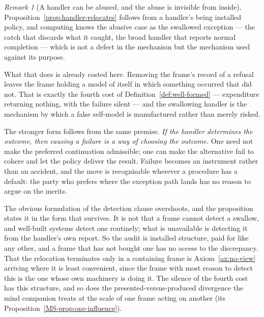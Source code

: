 \documentclass[11pt,a4paper]{article}
\theoremstyle{remark}\newtheorem{remark}[definition]{Remark}
\begin{document}
\begin{remark}[A handler can be abused, and the abuse is invisible from inside]\label{rem:handler-abuse}
Proposition~\ref{prop:handler-relocates} follows from a handler's being installed policy, and
computing knows the abusive case as the swallowed exception --- the catch that discards what it
caught, the broad handler that reports normal completion --- which is not a defect in the mechanism
but the mechanism used against its purpose.

What that does is already costed here. Removing the frame's record of a refusal
leaves the frame holding a model of itself in which
something occurred that did not. That is exactly the fourth cost of Definition~\ref{def:well-formed} ---
expenditure returning nothing, with the failure silent --- and the swallowing handler is the mechanism
by which a false self-model is manufactured rather than merely risked.

The stronger form follows from the same premise. \emph{If the handler
determines the outcome, then causing a failure is a way of choosing the outcome.} One need not make the
preferred continuation admissible; one can make the alternative fail to cohere and let the policy
deliver the result. Failure becomes an instrument rather than an accident, and the move is recognisable
wherever a procedure has a default: the party who prefers where the exception path lands has no reason
to argue on the merits.

The obvious formulation of the detection clause overshoots, and the proposition states it in the
form that survives. It is not that a frame cannot detect a swallow, and well-built systems detect one
routinely; what is unavailable is detecting it from the handler's own report. So the audit is
installed structure, paid for like any other, and a frame that has not bought one has no access to the
discrepancy. That the relocation terminates only in a containing frame is
Axiom~\ref{ax:no-view} arriving where it is least convenient, since the
frame with most reason to detect this is the one whose own machinery is doing it. The silence of the
fourth cost has this structure, and so does the presented-versus-produced divergence the mind
companion treats at the scale of one frame acting on another (its Proposition~\ref{MS-prop:one-influence}).
\end{remark}
\end{document}
